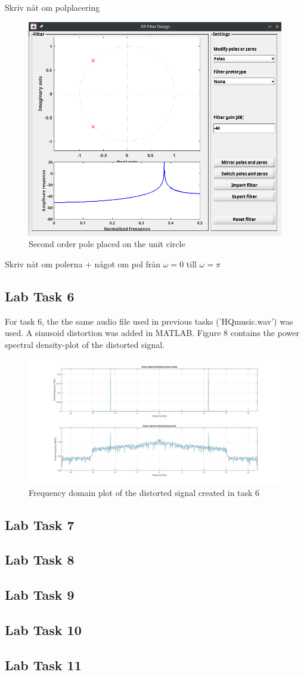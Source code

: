 \documentclass[a4paper,11pt]{article}
\begin{document}
Skriv nåt om polplacering
\begin{figure}[H]
    \centering
    \includegraphics[scale=0.6]{./images/2ndorder-pole.png}
    \caption{Second order pole placed on the unit circle}
    \label{fig:my_label}
\end{figure}
Skriv nåt om polerna + något om pol från $\omega = 0$ till $\omega = \pi$
\subsection{Lab Task 6}
For task 6, the the same audio file used in previous tasks ('HQmusic.wav') was used. A sinusoid distortion was added in MATLAB. Figure 8 contains the power spectral density-plot of the distorted signal.
\begin{figure}[H]
    \hspace{-50pt}\includegraphics[scale=0.28]{./images/Task6-FFT.jpg}
    \caption{Frequency domain plot of the distorted signal created in task 6}
    \label{fig:my_label}
\end{figure}
\subsection{Lab Task 7}
\subsection{Lab Task 8}
\subsection{Lab Task 9}
\subsection{Lab Task 10}
\subsection{Lab Task 11}
\end{document}
